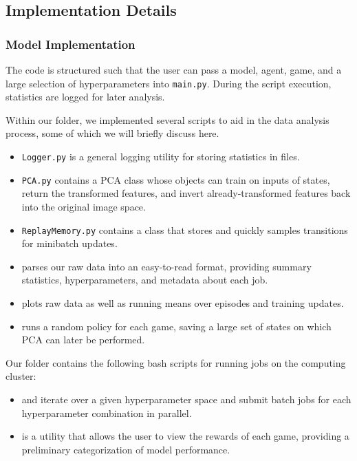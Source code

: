 \documentclass[11pt]{article}
\begin{document}
\subsection{Implementation Details}

\subsubsection{Model Implementation}

The code is structured such that the user can pass a model, agent, game, and a large selection of hyperparameters into \texttt{main.py}. During the script execution, statistics are logged for later analysis. 

Within our  folder, we implemented several scripts to aid in the data analysis process, some of which we will briefly discuss here. 

\begin{itemize}
    \item \texttt{Logger.py} is a general logging utility for storing statistics in files. 
    \item \texttt{PCA.py} contains a PCA class whose objects can train on inputs of states, return the transformed features, and invert already-transformed features back into the original image space. 
    \item \texttt{ReplayMemory.py} contains a class that stores and quickly samples transitions for minibatch updates. 
    \item {} parses our raw data into an easy-to-read format, providing summary statistics, hyperparameters, and metadata about each job. 
    \item {} plots raw data as well as running means over episodes and training updates. 
    \item {} runs a random policy for each game, saving a large set of states on which PCA can later be performed. 
\end{itemize}
 
Our  folder contains the following bash scripts for running jobs on the computing cluster:

\begin{itemize}
    \item {} and  iterate over a given hyperparameter space and submit batch jobs for each hyperparameter combination in parallel.
    \item {} is a utility that allows the user to view the rewards of each game, providing a preliminary categorization of model performance. 
\end{itemize}
\end{document}
